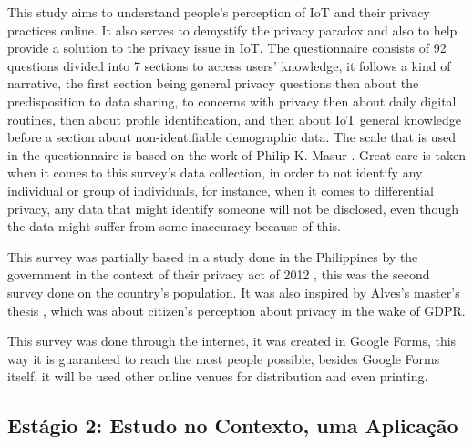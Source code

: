 \documentclass[conference]{IEEEtran}
\begin{document}
This study aims to understand people's perception of IoT and their privacy
practices online. It also serves to demystify the privacy paradox and also
to help provide a solution to the privacy issue in IoT. The questionnaire
consists of 92 questions divided into 7 sections to access users' knowledge,
it follows a kind of narrative, the first section being general privacy
questions then about the predisposition to data sharing, to concerns with
privacy then about daily digital routines, then about profile identification,
and then about IoT general knowledge before a section about non-identifiable
demographic data. The scale that is used in the questionnaire is based on
the work of Philip K. Masur \cite{masur2018situational}. Great care is taken
when it comes to this survey's data collection, in order to not identify
any individual or group of individuals, for instance, when it comes to differential
privacy, any data that might identify someone will not be disclosed, even
though the data might suffer from some inaccuracy because of this.

This survey was partially based in a study done in the Philippines by the
government in the context of their privacy act of 2012 \cite{Philippine2022Conduct},
this was the second survey done on the country's population. It was also
inspired by Alves's master's thesis \cite{alves2021}, which was about citizen's
perception about privacy in the wake of GDPR.

This survey was done through the internet, it was created in Google Forms,
this way it is guaranteed to reach the most people possible, besides Google
Forms itself, it will be used other online venues for distribution and even
printing.

\subsection{Estágio 2: Estudo no Contexto, uma Aplicação}
\end{document}
